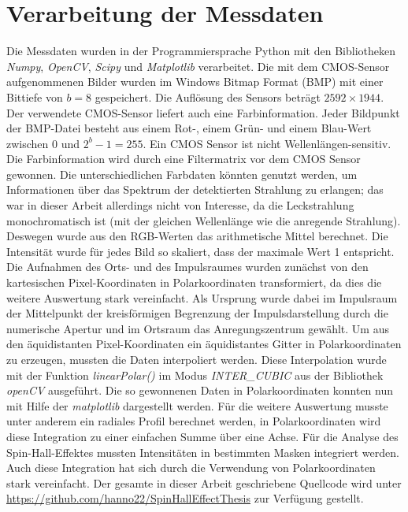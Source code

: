 \documentclass[a4paper, titlepage,  ngerman]{book}
\begin{document}
	\section{Verarbeitung der Messdaten}
	\label{sec:polar_calculation}
	Die Messdaten wurden in der Programmiersprache Python mit den Bibliotheken \textit{Numpy}, \textit{OpenCV}, \textit{Scipy} und \textit{Matplotlib} verarbeitet. Die mit dem CMOS-Sensor aufgenommenen Bilder wurden im Windows Bitmap Format (BMP) mit einer Bittiefe von  $b = 8$ gespeichert. Die Auflösung des Sensors beträgt $2592 \times 1944$. Der verwendete CMOS-Sensor liefert auch eine Farbinformation. Jeder Bildpunkt der BMP-Datei besteht aus einem Rot-, einem Grün- und einem Blau-Wert zwischen $0$ und $2^b - 1= 255$. Ein CMOS Sensor ist nicht Wellenlängen-sensitiv. Die Farbinformation wird durch eine Filtermatrix vor dem CMOS Sensor gewonnen. Die unterschiedlichen Farbdaten könnten genutzt werden, um Informationen über das Spektrum der detektierten Strahlung zu erlangen; das war in dieser Arbeit allerdings nicht von Interesse, da die Leckstrahlung monochromatisch ist (mit der gleichen Wellenlänge wie die anregende Strahlung). Deswegen wurde aus den RGB-Werten das arithmetische Mittel berechnet. Die Intensität wurde für jedes Bild so skaliert, dass der maximale Wert 1 entspricht. Die Aufnahmen des Orts- und des Impulsraumes wurden zunächst von den kartesischen Pixel-Koordinaten in Polarkoordinaten transformiert, da dies die weitere Auswertung stark vereinfacht. Als Ursprung wurde dabei im Impulsraum der Mittelpunkt der kreisförmigen Begrenzung der Impulsdarstellung durch die numerische Apertur und im Ortsraum das Anregungszentrum gewählt. Um aus den äquidistanten Pixel-Koordinaten ein äquidistantes Gitter in Polarkoordinaten zu erzeugen, mussten die Daten interpoliert werden. Diese Interpolation wurde mit der Funktion \textit{linearPolar()} im Modus \textit{INTER\_CUBIC} aus der Bibliothek \textit{openCV} ausgeführt. Die so gewonnenen Daten in Polarkoordinaten konnten nun mit Hilfe der \textit{matplotlib} dargestellt werden. Für die weitere Auswertung musste unter anderem ein radiales Profil berechnet werden, in Polarkoordinaten wird diese Integration zu einer einfachen Summe über eine Achse. Für die Analyse des Spin-Hall-Effektes mussten Intensitäten in bestimmten Masken integriert werden. Auch diese Integration hat sich durch die Verwendung von Polarkoordinaten stark vereinfacht. Der gesamte in dieser Arbeit geschriebene Quellcode wird unter \url{https://github.com/hanno22/SpinHallEffectThesis} zur Verfügung gestellt.
	\newpage
	
\end{document}
